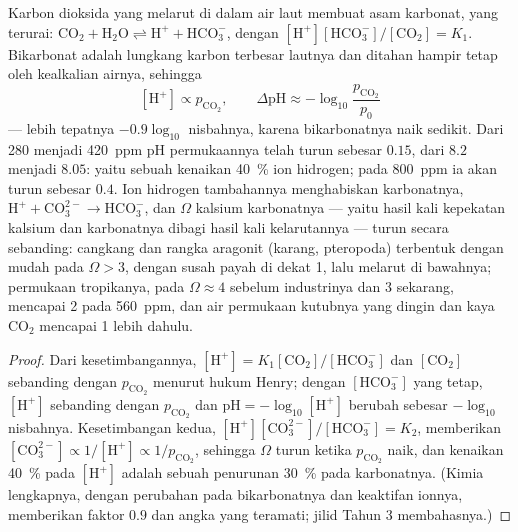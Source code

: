 \begin{theorem}[Pengasaman]\label{thm:b2:global-change:acid}
Karbon dioksida yang melarut di dalam air laut membuat asam karbonat,
yang terurai: $\ensuremath{\mathrm{CO_2}} + \ensuremath{\mathrm{H_2O}} \rightleftharpoons \ensuremath{\mathrm{H^{+}}} +
\ensuremath{\mathrm{HCO_3^{-}}}$, dengan $[\ensuremath{\mathrm{H^{+}}}][\ensuremath{\mathrm{HCO_3^{-}}}]/[\ensuremath{\mathrm{CO_2}}] = K_1$.
Bikarbonat adalah lungkang karbon terbesar lautnya dan ditahan hampir
tetap oleh kealkalian airnya, sehingga
\[
[\ensuremath{\mathrm{H^{+}}}] \propto p_{\ensuremath{\mathrm{CO_2}}}, \qquad
\Delta\mathrm{pH} \approx -\log_{10}\frac{p_{\ensuremath{\mathrm{CO_2}}}}{p_0}
\]
--- lebih tepatnya $-0.9\log_{10}$ nisbahnya, karena bikarbonatnya naik
sedikit. Dari 280 menjadi \qty{420}{ppm} pH permukaannya telah turun
sebesar $0.15$, dari $8.2$ menjadi $8.05$: yaitu sebuah kenaikan
\qty{40}{\%} ion hidrogen; pada \qty{800}{ppm} ia akan turun sebesar
$0.4$. Ion hidrogen tambahannya menghabiskan karbonatnya, $\ensuremath{\mathrm{H^{+}}} + \ensuremath{\mathrm{CO_3^{2-}}} \to \ensuremath{\mathrm{HCO_3^{-}}}$, dan \emph{} $\Omega$
kalsium karbonatnya --- yaitu hasil kali kepekatan kalsium dan
karbonatnya dibagi hasil kali kelarutannya --- turun secara sebanding:
cangkang dan rangka aragonit (karang, pteropoda) terbentuk dengan mudah
pada $\Omega > 3$, dengan susah payah di dekat 1, lalu melarut di
bawahnya; permukaan tropikanya, pada $\Omega \approx 4$ sebelum
industrinya dan 3 sekarang, mencapai 2 pada \qty{560}{ppm}, dan air
permukaan kutubnya yang dingin dan kaya \ensuremath{\mathrm{CO_2}} mencapai 1 lebih
dahulu.
\end{theorem}
\begin{proof}
Dari kesetimbangannya, $[\ensuremath{\mathrm{H^{+}}}] = K_1[\ensuremath{\mathrm{CO_2}}]/[\ensuremath{\mathrm{HCO_3^{-}}}]$ dan
$[\ensuremath{\mathrm{CO_2}}]$ sebanding dengan $p_{\ensuremath{\mathrm{CO_2}}}$ menurut hukum Henry;
dengan $[\ensuremath{\mathrm{HCO_3^{-}}}]$ yang tetap, $[\ensuremath{\mathrm{H^{+}}}]$ sebanding dengan
$p_{\ensuremath{\mathrm{CO_2}}}$ dan $\mathrm{pH} = -\log_{10}[\ensuremath{\mathrm{H^{+}}}]$ berubah sebesar
$-\log_{10}$ nisbahnya. Kesetimbangan kedua, $[\ensuremath{\mathrm{H^{+}}}][\ensuremath{\mathrm{CO_3^{2-}}}]/[\ensuremath{\mathrm{HCO_3^{-}}}]
= K_2$, memberikan $[\ensuremath{\mathrm{CO_3^{2-}}}] \propto 1/[\ensuremath{\mathrm{H^{+}}}] \propto
1/p_{\ensuremath{\mathrm{CO_2}}}$, sehingga $\Omega$ turun ketika $p_{\ensuremath{\mathrm{CO_2}}}$ naik,
dan kenaikan \qty{40}{\%} pada $[\ensuremath{\mathrm{H^{+}}}]$ adalah sebuah penurunan
\qty{30}{\%} pada karbonatnya. (Kimia lengkapnya, dengan perubahan pada
bikarbonatnya dan keaktifan ionnya, memberikan faktor $0.9$ dan angka
yang teramati; jilid Tahun 3 membahasnya.)
\end{proof}

